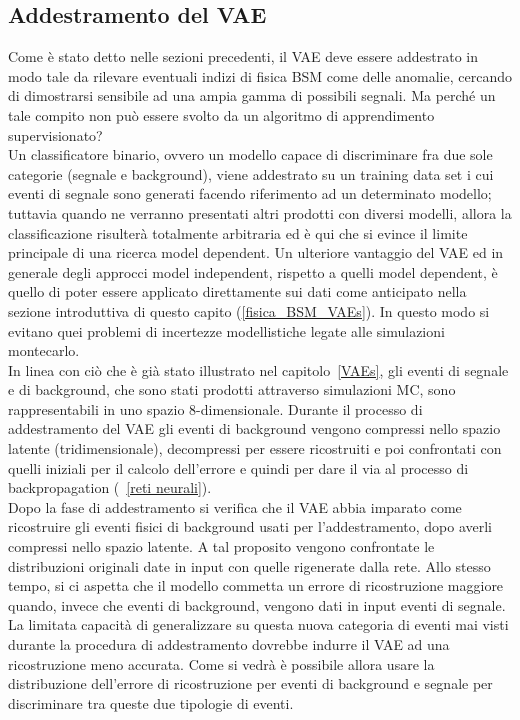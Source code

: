 \subsection{Addestramento del VAE}
\label{simulazione}
Come è stato detto nelle sezioni precedenti, il VAE deve essere addestrato in modo tale da rilevare eventuali indizi di fisica BSM come delle anomalie, cercando di dimostrarsi sensibile ad una ampia gamma di possibili segnali. Ma perché un tale compito non può essere svolto da un algoritmo di apprendimento supervisionato?\\
Un classificatore binario, ovvero un modello capace di discriminare fra due sole categorie (segnale e background), viene addestrato su un training data set i cui eventi di segnale sono generati facendo riferimento ad un determinato modello; tuttavia quando ne verranno presentati altri prodotti con diversi modelli, allora la classificazione risulterà totalmente arbitraria ed è qui che si evince il limite principale di una ricerca model dependent. Un ulteriore vantaggio del VAE ed in generale degli approcci model independent, rispetto a quelli model dependent, è quello di poter essere applicato direttamente sui dati come anticipato nella sezione introduttiva di questo capito (\ref{fisica_BSM_VAEs}). In questo modo si evitano quei problemi di incertezze modellistiche legate alle simulazioni montecarlo.\\
In linea con ciò che è già stato illustrato nel capitolo~\ref{VAEs}, gli eventi di segnale e di background, che sono stati prodotti attraverso simulazioni MC, sono rappresentabili in uno spazio 8-dimensionale. Durante il processo di addestramento del VAE gli eventi di background vengono compressi nello spazio latente (tridimensionale), decompressi per essere ricostruiti e poi confrontati con quelli iniziali per il calcolo dell'errore e quindi per dare il via al processo di backpropagation (~\ref{reti neurali}). \\
Dopo la fase di addestramento si verifica che il VAE abbia imparato come ricostruire gli eventi fisici di background usati per l'addestramento, dopo averli compressi nello spazio latente. A tal proposito vengono confrontate le distribuzioni originali date in input con quelle rigenerate dalla rete. Allo stesso tempo, si ci aspetta che il modello  commetta un errore di ricostruzione maggiore quando, invece che eventi di background, vengono dati in input eventi di segnale. La limitata capacità di generalizzare su questa nuova categoria di eventi mai visti durante la procedura di addestramento dovrebbe indurre il VAE ad una ricostruzione meno accurata. Come si vedrà è possibile allora usare la distribuzione dell'errore di ricostruzione per eventi di background e segnale per discriminare tra queste due tipologie di eventi.\\
